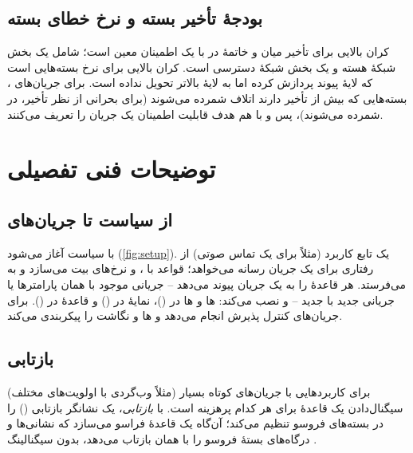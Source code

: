 \documentclass[11pt,a4paper]{article}
\begin{document}
\subsection{بودجهٔ تأخیر بسته و نرخ خطای بسته}
 کران بالایی برای تأخیر میان  و خاتمهٔ  در  با یک اطمینان معین است؛ شامل یک بخش شبکهٔ هسته و یک بخش
شبکهٔ دسترسی است.  کران بالایی برای نرخ بسته‌هایی است که لایهٔ پیوند پردازش کرده اما به لایهٔ بالاتر تحویل نداده است. برای
جریان‌های ، بسته‌هایی که بیش از  تأخیر دارند اتلاف شمرده می‌شوند (برای  بحرانی از نظر تأخیر، در 
شمرده می‌شوند)، پس  و  با هم هدف قابلیت اطمینان یک جریان  را تعریف می‌کنند.

\section{توضیحات فنی تفصیلی}

\subsection{از سیاست تا جریان‌های }
 با سیاست آغاز می‌شود (\cref{fig:setup}). یک تابع کاربرد (مثلاً  برای یک تماس صوتی) از  رفتاری برای یک جریان
رسانه می‌خواهد؛  قواعد  با ،  و نرخ‌های بیت می‌سازد و به  می‌فرستد.  هر قاعدهٔ
 را به یک جریان  پیوند می‌دهد -- جریانی موجود با همان پارامترها یا جریانی جدید با  جدید -- و نصب می‌کند:
ها و ها در  ()، نمایهٔ  در  () و قاعدهٔ  در  ().
 برای جریان‌های  کنترل پذیرش انجام می‌دهد و ها و نگاشت  را پیکربندی می‌کند.

\begin{acnfigure}
  \caption{برقراری یک جریان  از نوع  با تحریک یک تابع کاربرد (ساده‌شده).}
  \label{fig:setup}
\end{acnfigure}

\subsection{ بازتابی}
برای کاربردهایی با جریان‌های کوتاه بسیار (مثلاً وب‌گردی با اولویت‌های مختلف) سیگنال‌دادن یک قاعدهٔ  برای هر کدام پرهزینه است. با
\emph{ بازتابی}،  یک نشانگر  بازتابی () را در بسته‌های فروسو تنظیم می‌کند؛ آن‌گاه  یک قاعدهٔ
 فراسو می‌سازد که نشانی‌ها و درگاه‌های بستهٔ فروسو را با همان  بازتاب می‌دهد، بدون سیگنالینگ .
\end{document}
